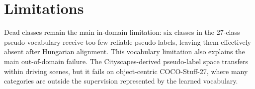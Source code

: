\documentclass{article}
\begin{document}
\section{Limitations}
\label{sec:limitations}

\noindent Dead classes remain the main in-domain limitation: six classes in the 27-class pseudo-vocabulary receive too few reliable pseudo-labels, leaving them effectively absent after Hungarian alignment. This vocabulary limitation also explains the main out-of-domain failure. The Cityscapes-derived pseudo-label space transfers within driving scenes, but it fails on object-centric COCO-Stuff-27, where many categories are outside the supervision represented by the learned vocabulary.
\end{document}
